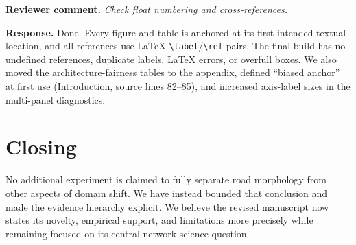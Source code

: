 \documentclass[10pt]{article}
\newcommand{\review}[1]{\textbf{Reviewer comment.} \emph{#1}}
\newcommand{\response}{\textbf{Response.} }
\begin{document}
\review{Check float numbering and cross-references.}

\response Done. Every figure and table is anchored at its first intended
textual location, and all references use LaTeX \verb|\label|/\verb|\ref| pairs.
The final build has no undefined references, duplicate labels, LaTeX errors, or
overfull boxes. We also moved the architecture-fairness tables to the appendix,
defined ``biased anchor'' at first use (Introduction, source lines 82--85), and
increased axis-label sizes in the multi-panel diagnostics.

\section*{Closing}

No additional experiment is claimed to fully separate road morphology from
other aspects of domain shift. We have instead bounded that conclusion and
made the evidence hierarchy explicit. We believe the revised manuscript now
states its novelty, empirical support, and limitations more precisely while
remaining focused on its central network-science question.
\end{document}
